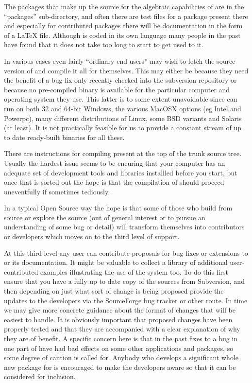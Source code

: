 The packages that make up the source for the algebraic capabilities of
{\REDUCE} are in the ``packages'' sub-directory, and often there are test
files for a package present there and especially for contributed
packages there will be documentation in the form of a \LaTeX{} file.
Although {\REDUCE} is coded in its own language many people in the past
have found that it does not take too long to start to get used to it.

In various cases even fairly ``ordinary end users'' may wish to fetch the 
source version of {\REDUCE} and compile it all for themselves. This may either 
be because they need the benefit of a bug-fix only recently checked into the 
subversion repository or because no pre-compiled binary is available for the 
particular computer and operating system they use. This latter is to some 
extent unavoidable since {\REDUCE} can run on both 32 and 64-bit Windows, the 
various MacOSX options (eg Intel and Powerpc), many different distributions 
of Linux, some BSD variants and Solaris (at least). It is not practically 
feasible for us to provide a constant stream of up to date ready-built 
binaries for all these.

There are instructions for compiling {\REDUCE} present at the top of the trunk 
source tree. Usually the hardest issue seems to be encuring that your 
computer has an adequate set of development tools and libraries installled 
before you start, but once that is sorted out the hope is that the 
compilation of {\REDUCE} should proceed uneventfully if sometimes tediously.

In a typical Open Source way the hope is that some of those who build {\REDUCE} 
from source or explore the source (out of general interest or to pursue an 
understanding of some bug or detail) will transform themselves into 
contributors or developers which moves on to the third level of support.

At this third level any user can contribute proposals for bug fixes or
extensions to {\REDUCE} or its documentation. It might be valuable to
collect a library of additional user-contributed examples illustrating
the use of the system too. To do this first ensure that you have a
fully up to date copy of the sources from Subversion, and then
depending on just what sort of change is being proposed provide the
updates to the developers via the SourceForge bug tracker or other
route. In time we may give more concrete guidance about the format of
changes that will be easiest to handle. It is obviously important that
proposed changes have been properly tested and that they are
accompanied with a clear explanation of why they are of benefit. A
specific concern here is that in the past fixes to a bug in one part
of {\REDUCE} have had bad effects on some other applications and
packages, so some degree of caution is called for. Anybody who
develops a significant whole new package for {\REDUCE} is encouraged to
make the developers aware so that it can be considered for inclusion.

